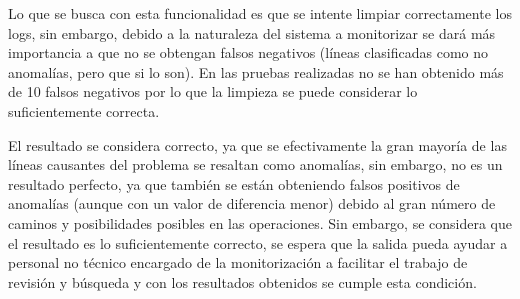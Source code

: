 Lo que se busca con esta funcionalidad es que se intente limpiar correctamente los logs, sin embargo, debido a la naturaleza del sistema a monitorizar se dará más importancia a que no se obtengan falsos negativos (líneas clasificadas como no anomalías, pero que si lo son). En las pruebas realizadas no se han obtenido más de 10 falsos negativos por lo que la limpieza se puede considerar lo suficientemente correcta. 


El resultado se considera correcto, ya que se efectivamente la gran mayoría de las líneas causantes del problema se resaltan como anomalías, sin embargo, no es un resultado perfecto, ya que también se están obteniendo falsos positivos de anomalías (aunque con un valor de diferencia menor) debido al gran número de caminos y posibilidades posibles en las operaciones. Sin embargo, se considera que el resultado es lo suficientemente correcto, se espera que la salida pueda ayudar a personal no técnico encargado de la monitorización a facilitar el trabajo de revisión y búsqueda y con los resultados obtenidos se cumple esta condición.


